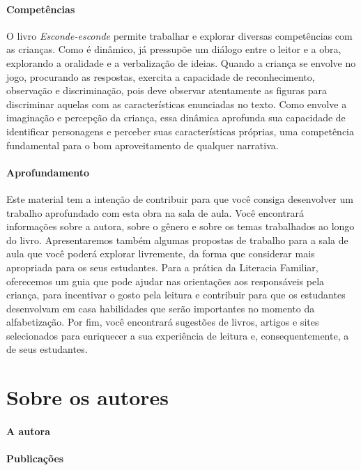 \documentclass[11pt]{extarticle}
\begin{document}
\paragraph{Competências}
O livro \textit{Esconde-esconde} permite trabalhar e explorar diversas competências com as crianças. Como é dinâmico, já pressupõe um diálogo entre o leitor e a obra, explorando a oralidade e a verbalização de ideias. Quando a criança se envolve no jogo, procurando as respostas, exercita a capacidade de reconhecimento, observação e discriminação, pois deve observar atentamente as figuras para discriminar aquelas com as características enunciadas no texto. Como envolve a imaginação e percepção da criança, essa dinâmica aprofunda sua capacidade de identificar personagens e perceber suas características próprias, uma competência fundamental para o bom aproveitamento de qualquer narrativa.


\paragraph{Aprofundamento} Este material tem a 
intenção de contribuir para que você consiga desenvolver um trabalho aprofundado 
com esta obra na sala de aula. Você encontrará informações sobre a autora, sobre 
o gênero e sobre os temas trabalhados ao longo do livro. Apresentaremos também 
algumas propostas de trabalho para a sala de aula que você poderá explorar livremente, 
da forma que considerar mais apropriada para os seus estudantes. Para a prática 
da Literacia Familiar, oferecemos um guia que pode ajudar nas orientações aos 
responsáveis pela criança, para incentivar o gosto pela leitura e contribuir para 
que os estudantes desenvolvam em casa habilidades que serão importantes no momento 
da alfabetização. Por fim, você encontrará sugestões de livros, artigos e sites 
selecionados para enriquecer a sua experiência de leitura e, 
consequentemente, a de seus estudantes.



\section{Sobre os autores}

\paragraph{A autora} 

\paragraph{Publicações}
\end{document}
